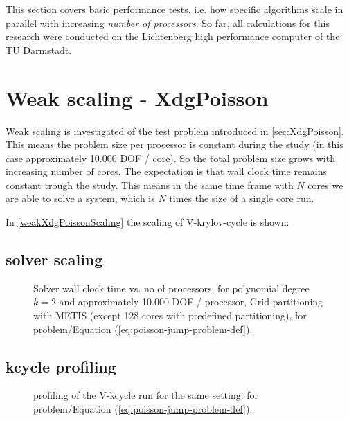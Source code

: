 This section covers basic performance tests, i.e. how specific algorithms scale in parallel with increasing \emph{number of processors}. So far, all calculations for this research were conducted on the Lichtenberg high performance computer of the TU Darmstadt.

\section{Weak scaling - XdgPoisson}
Weak scaling is investigated of the test problem introduced in \ref{sec:XdgPoisson}. This means the problem size per processor is constant during the study (in this case approximately 10.000 DOF / core). So the total problem size grows with increasing number of cores. The expectation is that wall clock time remains constant trough the study. This means in the same time frame with $N$ cores we are able to solve a system, which is $N$ times the size of a single core run.

In \ref{weakXdgPoissonScaling} the scaling of V-krylov-cycle is shown:

\subsection{solver scaling}

\graphicspath{{./apdx-MPISolverPerformance/weakScaling/XdgPoisson/plots/}} 
\begin{figure}[h!]
	\begin{center}
		
	\end{center}
	\caption{
		Solver wall clock time vs. no of processors, for polynomial degree $k=2$ and approximately 10.000 DOF / processor, Grid partitioning with METIS (except 128 cores with predefined partitioning),
		for problem/Equation (\ref{eq:poisson-jump-problem-def}).
	}
	\label{fig:weakXdgPoissonScaling}
\end{figure}

\subsection{kcycle profiling}{\tiny }
\graphicspath{{./apdx-MPISolverPerformance/weakScaling/XdgPoisson/plots/}} 
\begin{figure}[h!]
	\begin{center}
		
	\end{center}
	\caption{
		profiling of the V-kcycle run for the same setting:
		for problem/Equation (\ref{eq:poisson-jump-problem-def}).
	}
	\label{fig:weakXdgPoisson-kcycle-profiling}
\end{figure}


